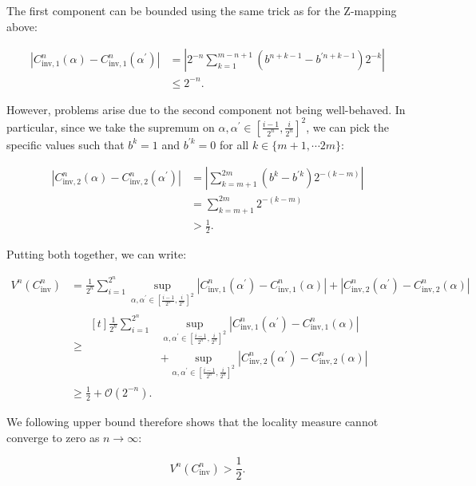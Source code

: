 \documentclass[10pt,letterpaper]{article}
\def\bO{\mathcal{O}}
\begin{document}
The first component can be bounded using the same trick as for the Z-mapping above:

$$
\begin{aligned}
|C^n_{\textrm{inv},1}(\alpha) - C^n_{\textrm{inv},1}(\alpha^\prime)| &= \left| 2^{-n} \sum_{k=1}^{m-n+1} (b^{n+k-1} - b^{\prime n+k-1}) 2^{-k} \right| \\
&\leq 2^{-n}.
\end{aligned}
$$

However, problems arise due to the second component not being well-behaved. In particular, since we take the supremum on $\alpha,\alpha^\prime \in \left[\tfrac{i-1}{2^n},\tfrac{i}{2^n}\right]^2$, we can pick the specific values such that $b^k=1$ and $b^{\prime k}=0$ for all $k \in \{m+1, \cdots 2m\}$:

$$
\begin{aligned}
|C^n_{\textrm{inv},2}(\alpha) - C^n_{\textrm{inv},2}(\alpha^\prime)| &= \left| \sum_{k=m+1}^{2m} (b^k - b^{\prime k}) 2^{-(k-m)} \right| \\
&= \sum_{k=m+1}^{2m} 2^{-(k-m)} \\
&> \frac 12.
\end{aligned}
$$

Putting both together, we can write:

$$
\begin{aligned}
V^n(C^n_\textrm{inv}) &= \frac{1}{2^n}\sum_{i=1}^{2^n} \sup_{\alpha, \alpha^\prime \in \left[\tfrac{i-1}{2^n}, \tfrac{i}{2^n}\right]^2} |C^n_{\textrm{inv},1}(\alpha^\prime) - C^n_{\textrm{inv},1}(\alpha)| + |C^n_{\textrm{inv},2}(\alpha^\prime) - C^n_{\textrm{inv},2}(\alpha)| \\
&\geq
\begin{aligned}[t]
	\frac{1}{2^n}\sum_{i=1}^{2^n}&
	\sup_{\alpha, \alpha^\prime \in \left[\tfrac{i-1}{2^n}, \tfrac{i}{2^n}\right]^2} |C^n_{\textrm{inv},1}(\alpha^\prime) - C^n_{\textrm{inv},1}(\alpha)|\\
	&+ \sup_{\alpha, \alpha^\prime \in \left[\tfrac{i-1}{2^n}, \tfrac{i}{2^n}\right]^2} |C^n_{\textrm{inv},2}(\alpha^\prime) - C^n_{\textrm{inv},2}(\alpha)|
\end{aligned}\\
&\geq \frac 12 + \bO(2^{-n}).
\end{aligned}
$$

We following upper bound therefore shows that the locality measure cannot converge to zero as $n \to \infty$: 

$$
V^n(C^n_\textrm{inv}) > \frac 12.
$$
\end{document}
